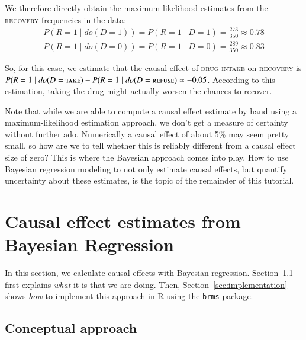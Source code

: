 \documentclass[nobib]{tufte-handout}
\newcommand{\mathdo}{\mathit{do}}
\begin{document}
We therefore directly obtain the maximum-likelihood estimates from the \textsc{recovery} frequencies in the data:
\begin{equation}
  \begin{split}
    P(R=1\mid \mathdo(D=1))
    = P(R=1\mid D=1)
    = \frac{273}{350} \approx 0.78
  \end{split}
\end{equation}
%
\begin{equation}
  \begin{split}
    P(R=1\mid \mathdo(D=0))
    = P(R=1\mid D=0)
    = \frac{289}{350} \approx 0.83
  \end{split}
\end{equation}

So, for this case, we estimate that the causal effect of \textsc{drug intake} on \textsc{recovery} is $P(R=1\mid \mathdo(D=\textsc{take})-P(R=1\mid \mathdo(D=\textsc{refuse}) \approx -0.05$.
According to this estimation, taking the drug might actually worsen the chances to recover.
\medskip

Note that while we are able to compute a causal effect estimate by hand using a maximum-likelihood estimation approach, we don't get a measure of certainty without further ado. 
Numerically a causal effect of about 5\% may seem pretty small, so how are we to tell whether this is reliably different from a causal effect size of zero?
This is where the Bayesian approach comes into play.
How to use Bayesian regression modeling to not only estimate causal effects, but quantify uncertainty about these estimates, is the topic of the remainder of this tutorial.

\section{Causal effect estimates from Bayesian Regression} \label{sec:programming}

In this section, we calculate causal effects with Bayesian regression.
Section~\ref{sec:conceptual-approach} first explains \textit{what} it is that we are doing.
Then, Section~\ref{sec:implementation} shows \textit{how} to implement this approach in R using the \texttt{brms} package.

\subsection{Conceptual approach}
\label{sec:conceptual-approach}
\end{document}
